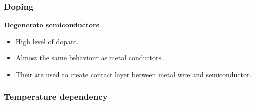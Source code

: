 \documentclass{beamer}
\begin{document}
	\begin{frame}
    \frametitle{Doping}
		\small
		
		\textbf{Degenerate semiconductors}
		
		\begin{itemize}
			\item High level of dopant.
			\item Almost the same behaviour as metal conductors.
			\item Their are used to create contact layer between metal wire and semiconductor.
		\end{itemize}
	\end{frame}
	\begin{frame}
    \frametitle{Temperature dependency}
	\end{frame}
\end{document}

